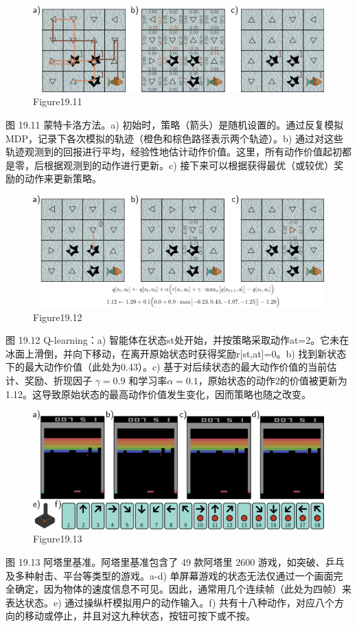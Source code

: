\begin{figure}[ht!]
\centering
\includegraphics[width=0.7\linewidth]{png/chapter19/ReinforceMC.png}
\caption{Figure19.11}
\end{figure}
图 19.11 蒙特卡洛方法。a) 初始时，策略（箭头）是随机设置的。通过反复模拟 MDP，记录下各次模拟的轨迹（橙色和棕色路径表示两个轨迹）。b) 通过对这些轨迹观测到的回报进行平均，经验性地估计动作价值。这里，所有动作价值起初都是零，后根据观测到的动作进行更新。c) 接下来可以根据获得最优（或较优）奖励的动作来更新策略。

\begin{figure}[ht!]
\centering
\includegraphics[width=0.7\linewidth]{png/chapter19/ReinforceTD.png}
\caption{Figure19.12}
\end{figure}
图 19.12 Q-learning：a) 智能体在状态st处开始，并按策略采取动作at=2。它未在冰面上滑倒，并向下移动，在离开原始状态时获得奖励r[st,at]=0。b) 找到新状态下的最大动作价值（此处为0.43）。c) 基于对后续状态的最大动作价值的当前估计、奖励、折现因子 \(\gamma=0.9\) 和学习率\(\alpha=0.1\)，原始状态的动作2的价值被更新为1.12。这导致原始状态的最高动作价值发生变化，因而策略也随之改变。


\begin{figure}[ht!]
\centering
\includegraphics[width=0.7\linewidth]{png/chapter19/ReinforceDQL.png}
\caption{Figure19.13}
\end{figure}
图 19.13 阿塔里基准。阿塔里基准包含了 49 款阿塔里 2600 游戏，如突破、乒乓及多种射击、平台等类型的游戏。a-d) 单屏幕游戏的状态无法仅通过一个画面完全确定，因为物体的速度信息不可见。因此，通常用几个连续帧（此处为四帧）来表达状态。e) 通过操纵杆模拟用户的动作输入。f) 共有十八种动作，对应八个方向的移动或停止，并且对这九种状态，按钮可按下或不按。

